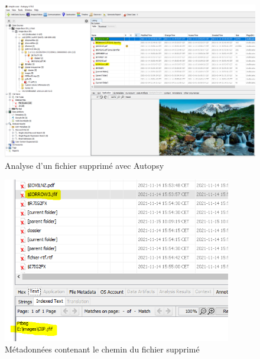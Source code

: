 \documentclass[a4paper]{article}
\begin{document}
\begin{figure}[H]
    \centering
    \includegraphics[width=0.99\linewidth]{images/004-autopsy.PNG}
    \caption{Analyse d'un fichier supprimé avec Autopsy}
    \label{fig:autopsy}
\end{figure}

\begin{figure}[H]
    \centering
    \includegraphics[width=10cm]{images/007-autopsy.PNG}
    \caption{Métadonnées contenant le chemin du fichier supprimé}
    \label{fig:autopsy2}
\end{figure}
\end{document}
